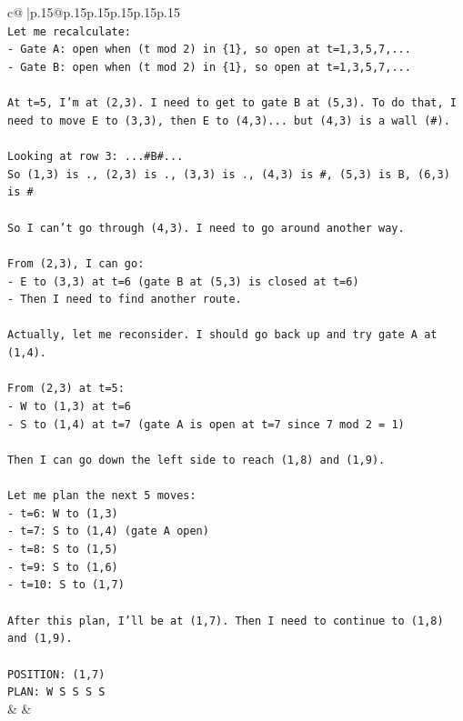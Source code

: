 \documentclass{article}
\begin{document}
{\begin{supertabular}{c@{$\;$}|p{.15\linewidth}@{}p{.15\linewidth}p{.15\linewidth}p{.15\linewidth}p{.15\linewidth}p{.15\linewidth}}
{{{\\ 
\texttt{Let me recalculate:} \\
\texttt{{-} Gate A: open when (t mod 2) in \{1\}, so open at t=1,3,5,7,...} \\
\texttt{{-} Gate B: open when (t mod 2) in \{1\}, so open at t=1,3,5,7,...} \\
\\ 
\texttt{At t=5, I'm at (2,3). I need to get to gate B at (5,3). To do that, I need to move E to (3,3), then E to (4,3)... but (4,3) is a wall (\#).} \\
\\ 
\texttt{Looking at row 3: ...\#B\#...} \\
\texttt{So (1,3) is ., (2,3) is ., (3,3) is ., (4,3) is \#, (5,3) is B, (6,3) is \#} \\
\\ 
\texttt{So I can't go through (4,3). I need to go around another way.} \\
\\ 
\texttt{From (2,3), I can go:} \\
\texttt{{-} E to (3,3) at t=6 (gate B at (5,3) is closed at t=6)} \\
\texttt{{-} Then I need to find another route.} \\
\\ 
\texttt{Actually, let me reconsider. I should go back up and try gate A at (1,4).} \\
\\ 
\texttt{From (2,3) at t=5:} \\
\texttt{{-} W to (1,3) at t=6} \\
\texttt{{-} S to (1,4) at t=7 (gate A is open at t=7 since 7 mod 2 = 1)} \\
\\ 
\texttt{Then I can go down the left side to reach (1,8) and (1,9).} \\
\\ 
\texttt{Let me plan the next 5 moves:} \\
\texttt{{-} t=6: W to (1,3)} \\
\texttt{{-} t=7: S to (1,4) (gate A open)} \\
\texttt{{-} t=8: S to (1,5)} \\
\texttt{{-} t=9: S to (1,6)} \\
\texttt{{-} t=10: S to (1,7)} \\
\\ 
\texttt{After this plan, I'll be at (1,7). Then I need to continue to (1,8) and (1,9).} \\
\\ 
\texttt{POSITION: (1,7)} \\
\texttt{PLAN: W S S S S} \\
            }
        }
    }
    & & \\ \\


\end{supertabular}}
\end{document}
